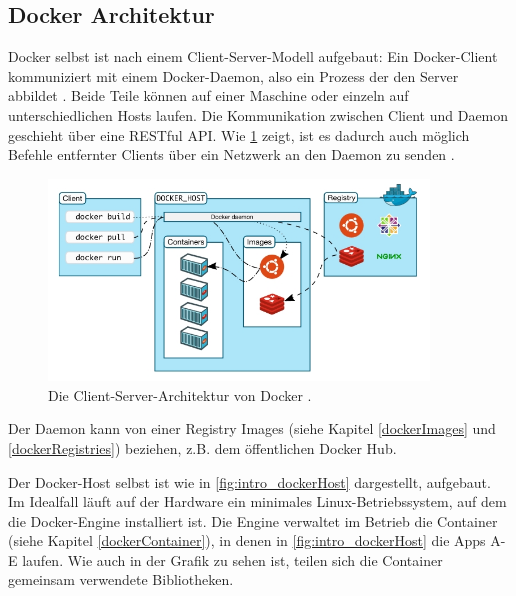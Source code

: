 \documentclass[../main.tex]{subfiles}
\begin{document}
		\subsection{Docker Architektur}
		\label{dockerArchitecture}
      Docker selbst ist nach einem Client-Server-Modell aufgebaut: Ein Docker-Client kommuniziert mit einem Docker-Daemon, also ein Prozess der den Server abbildet \cite{dockerUnderstandingDocker}. Beide Teile können auf einer Maschine oder einzeln auf unterschiedlichen Hosts laufen. Die Kommunikation zwischen Client und Daemon geschieht über eine \acrshort{REST}ful \acrshort{API}. Wie \fig \ref{fig:intro_dockerArchitecture} zeigt, ist es dadurch auch möglich Befehle entfernter Clients über ein Netzwerk an den Daemon zu senden \cite[S.3]{dockerSecIntro}.

      \begin{figure}[h]
          \centering
          \includegraphics[width=0.9\textwidth]{./images/intro_dockerArchitecture.jpg}
          \caption{Die Client-Server-Architektur von Docker \cite{dockerUnderstandingDocker}.}
          \label{fig:intro_dockerArchitecture}
      \end{figure}

      Der Daemon kann von einer Registry Images (siehe Kapitel \ref{dockerImages} und \ref{dockerRegistries}) beziehen, z.B. dem öffentlichen Docker Hub.

      Der Docker-Host selbst ist wie in \fig \ref{fig:intro_dockerHost} dargestellt, aufgebaut. Im Idealfall läuft auf der Hardware ein minimales Linux-Betriebssystem, auf dem die Docker-Engine installiert ist. Die Engine verwaltet im Betrieb die Container (siehe Kapitel \ref{dockerContainer}), in denen in \fig \ref{fig:intro_dockerHost} die Apps A-E laufen. Wie auch in der Grafik zu sehen ist, teilen sich die Container gemeinsam verwendete Bibliotheken.%
\end{document}

